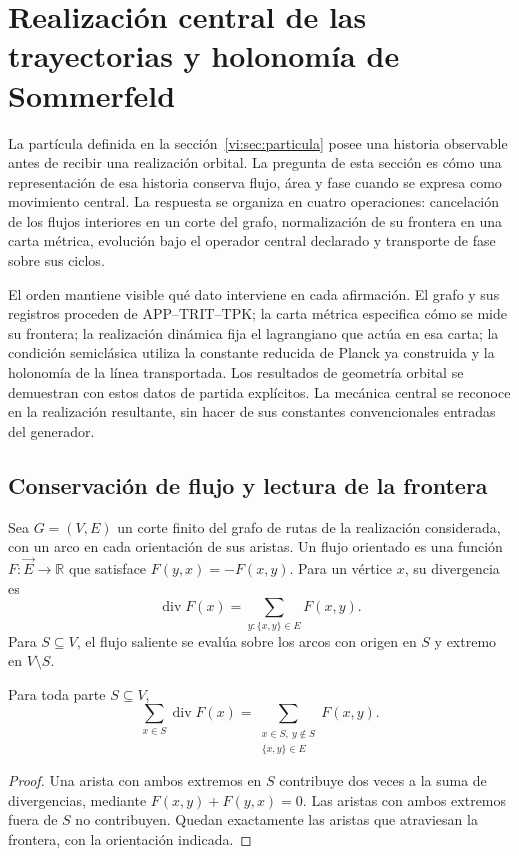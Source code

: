 \section{Realización central de las trayectorias y holonomía de Sommerfeld}
\label{vi:sec:kepler}

La partícula definida en la sección~\ref{vi:sec:particula} posee
una historia observable antes de recibir una realización orbital.
La pregunta de esta sección es cómo una representación de esa
historia conserva flujo, área y fase cuando se expresa como
movimiento central. La respuesta se organiza en cuatro operaciones:
cancelación de los flujos interiores en un corte del grafo,
normalización de su frontera en una carta métrica, evolución bajo
el operador central declarado y transporte de fase sobre sus ciclos.

El orden mantiene visible qué dato interviene en cada afirmación.
El grafo y sus registros proceden de APP--TRIT--TPK; la carta
métrica especifica cómo se mide su frontera; la realización dinámica
fija el lagrangiano que actúa en esa carta; la condición semiclásica
utiliza la constante reducida de Planck ya construida y la holonomía
de la línea transportada. Los resultados de geometría orbital se
demuestran con estos datos de partida explícitos. La mecánica
central se reconoce en la realización resultante, sin hacer de sus
constantes convencionales entradas del generador.

\subsection{Conservación de flujo y lectura de la frontera}
\label{vi:subsec:gauss}

Sea $G=(V,E)$ un corte finito del grafo de rutas de la
realización considerada, con un arco en cada orientación de sus
aristas. Un flujo orientado es una función
$F:\vec E\to\mathbb R$ que satisface
$F(y,x)=-F(x,y)$. Para un vértice $x$, su divergencia es
\begin{equation}
 \operatorname{div}F(x)
 =\sum_{y:\{x,y\}\in E}F(x,y).
 \label{vi:eq:divergencia-grafo}
\end{equation}
Para $S\subseteq V$, el flujo saliente se evalúa sobre los
arcos con origen en $S$ y extremo en $V\setminus S$.

\begin{theorem}
\label{vi:thm:gauss}
Para toda parte $S\subseteq V$,
\begin{equation}
 \sum_{x\in S}\operatorname{div}F(x)
 =\sum_{\substack{x\in S,\ y\notin S\\\{x,y\}\in E}}F(x,y).
 \label{vi:eq:gauss}
\end{equation}
\end{theorem}
\begin{proof}
Una arista con ambos extremos en $S$ contribuye dos veces a la
suma de divergencias, mediante $F(x,y)+F(y,x)=0$. Las aristas
con ambos extremos fuera de $S$ no contribuyen. Quedan
exactamente las aristas que atraviesan la frontera, con la
orientación indicada.
\end{proof}

